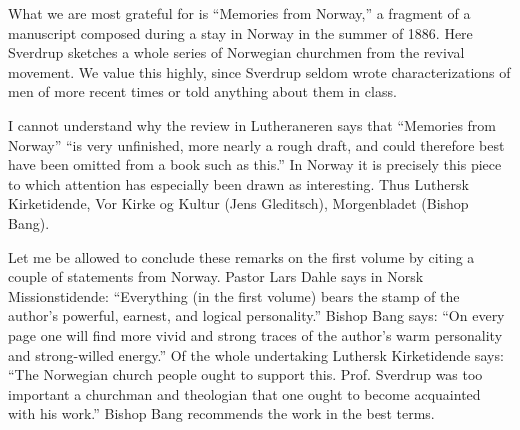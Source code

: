 What we are most grateful for is “Memories from Norway,” a fragment of a manuscript composed during a stay in Norway in the summer of 1886. Here Sverdrup sketches a whole series of Norwegian churchmen from the revival movement. We value this highly, since Sverdrup seldom wrote characterizations of men of more recent times or told anything about them in class.

I cannot understand why the review in Lutheraneren says that “Memories from Norway” “is very unfinished, more nearly a rough draft, and could therefore best have been omitted from a book such as this.” In Norway it is precisely this piece to which attention has especially been drawn as interesting. Thus Luthersk Kirketidende, Vor Kirke og Kultur (Jens Gleditsch), Morgenbladet (Bishop Bang).

Let me be allowed to conclude these remarks on the first volume by citing a couple of statements from Norway. Pastor Lars Dahle says in Norsk Missionstidende: “Everything (in the first volume) bears the stamp of the author’s powerful, earnest, and logical personality.” Bishop Bang says: “On every page one will find more vivid and strong traces of the author’s warm personality and strong-willed energy.” Of the whole undertaking Luthersk Kirketidende says: “The Norwegian church people ought to support this. Prof. Sverdrup was too important a churchman and theologian that one ought to become acquainted with his work.” Bishop Bang recommends the work in the best terms.